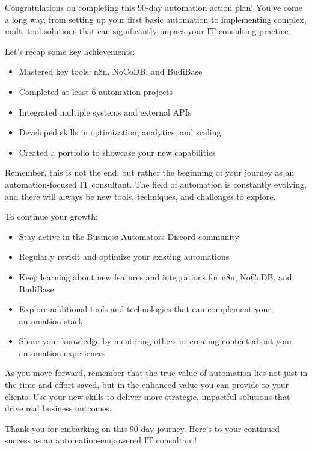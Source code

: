Congratulations on completing this 90-day automation action plan! You've come a long way, from setting up your first basic automation to implementing complex, multi-tool solutions that can significantly impact your IT consulting practice.

Let's recap some key achievements:

\begin{itemize}
    \item Mastered key tools: n8n, NoCoDB, and BudiBase
    \item Completed at least 6 automation projects
    \item Integrated multiple systems and external APIs
    \item Developed skills in optimization, analytics, and scaling
    \item Created a portfolio to showcase your new capabilities
\end{itemize}

Remember, this is not the end, but rather the beginning of your journey as an automation-focused IT consultant. The field of automation is constantly evolving, and there will always be new tools, techniques, and challenges to explore.

To continue your growth:

\begin{itemize}
    \item Stay active in the Business Automators Discord community
    \item Regularly revisit and optimize your existing automations
    \item Keep learning about new features and integrations for n8n, NoCoDB, and BudiBase
    \item Explore additional tools and technologies that can complement your automation stack
    \item Share your knowledge by mentoring others or creating content about your automation experiences
\end{itemize}

As you move forward, remember that the true value of automation lies not just in the time and effort saved, but in the enhanced value you can provide to your clients. Use your new skills to deliver more strategic, impactful solutions that drive real business outcomes.

Thank you for embarking on this 90-day journey. Here's to your continued success as an automation-empowered IT consultant!


